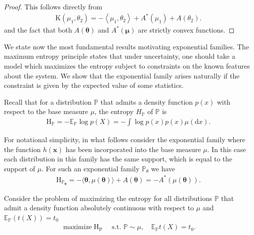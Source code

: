 \begin{proof}
    This follows directly from
    \begin{align*}
\mathrm{K}\left(\mu_1, \theta_2\right)=-\left\langle\mu_1, \theta_2\right\rangle+A^*\left(\mu_1\right)+A\left(\theta_2\right) .
\end{align*}
    and the fact that both $A(\boldsymbol{\theta})$ and $A^*(\boldsymbol{\mu})$ are strictly convex functions.
\end{proof}

We state now the most fundamental results motivating exponential families. The maximum entropy principle states that under uncertainty, one should take a model which maximizes the entropy subject to constraints on the known features about the system. We show that the exponential family arises naturally if the constraint is given by the expected value of some statistics.

Recall that for a distribution $\mathbb{P}$ that admits a density function $p(x)$ with respect to the base measure $\mu$, the entropy $H_{\mathbb{P}}$ of $\mathbb{P}$ is
\begin{align*}
\mathrm{H}_{\mathbb{P}}=-\mathbb{E}_{\mathbb{P}} \log p(X)=-\int \log p(x) p(x) \mu(\mathrm{d} x) .
\end{align*}


For notational simplicity, in what follows consider the exponential family where the function $h(\mathbf{x})$ has been incorporated into the base measure $\mu$. In this case each distribution in this family has the same support, which is equal to the support of $\mu$. For such an exponential family $\mathbb{P}_\theta$ we have
\begin{align*}
\mathrm{H}_{\mathbb{P}_{\boldsymbol{\theta}}}=-\langle\boldsymbol{\theta}, \mu(\boldsymbol{\theta})\rangle+A(\boldsymbol{\theta})=-A^*(\mu(\boldsymbol{\theta})).
\end{align*}

Consider the problem of maximizing the entropy for all distributions $\mathbb{P}$ that admit a density function absolutely continuous with respect to $\mu$ and $\mathbb{E}_{\mathbb{P}}(t(X))=t_0$
\begin{align*}
\operatorname{maximize} \mathrm{H}_{\mathrm{P}} \quad \text { s.t. } \mathbb{P} \sim \mu, \quad \mathbb{E}_{\mathbb{P}} t(X)=t_0 .
\end{align*}

